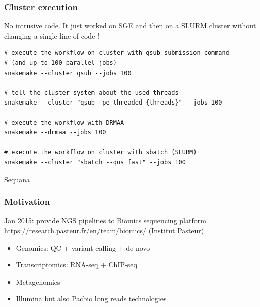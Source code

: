 \documentclass{beamer}
\begin{document}



\begin{frame}[fragile]
\frametitle{Cluster execution}

No intrusive code. It just worked on SGE and then on a SLURM cluster 
without changing a single line of code !

\begin{lstlisting}
# execute the workflow on cluster with qsub submission command
# (and up to 100 parallel jobs)
snakemake --cluster qsub --jobs 100

# tell the cluster system about the used threads
snakemake --cluster "qsub -pe threaded {threads}" --jobs 100

# execute the workflow with DRMAA
snakemake --drmaa --jobs 100

# execute the workflow on cluster with sbatch (SLURM)
snakemake --cluster "sbatch --qos fast" --jobs 100

\end{lstlisting}
\end{frame}


\begin{frame}[plain]
 \centering
 \begin{Huge}
 Sequana
 \end{Huge}
\end{frame}



\begin{frame}
\frametitle{Motivation}
\begin{block}{Jan 2015: provide NGS pipelines to Biomics sequencing platform 
https://research.pasteur.fr/en/team/biomics/ (Institut Pasteur)}
 \begin{itemize}
  \item Genomics: QC + variant calling + de-novo
  \item Transcriptomics: RNA-seq + ChIP-seq 
  \item Metagenomics
  \item Illumina but also Pacbio long reads technologies
 \end{itemize}
\end{block} 
\end{frame}
\end{document}

